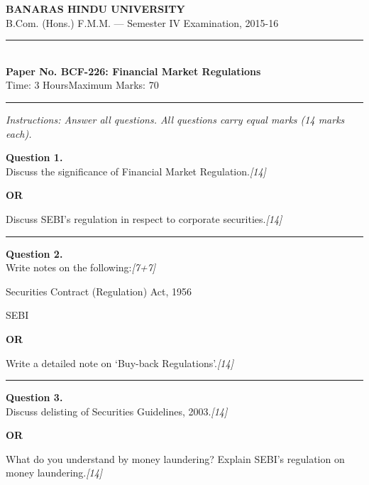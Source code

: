 \documentclass[11pt,a4paper]{article}
\newcommand{\pts}[1]{\hfill   \textit{[#1]}}
\begin{document}
\begin{center}
  {\large\bfseries BANARAS HINDU UNIVERSITY}\\[2pt]
  {\normalsize B.Com. (Hons.) F.M.M. --- Semester IV Examination, 2015-16}\\[6pt]
  \rule{0.8\linewidth}{0.5pt}\\[6pt]
  {\large\bfseries Paper No. BCF-226: Financial Market Regulations}\\[4pt]
  {\normalsize Time: 3 Hours\hfill Maximum Marks: 70}
\end{center}

\rule{\linewidth}{0.4pt}

\smallskip



\noindent   \textit{Instructions: Answer all questions. All questions carry equal marks (14 marks each).}

\bigskip




\noindent   \textbf{Question 1.} \\
Discuss the significance of Financial Market Regulation.\pts{14}

\centerline{   \textbf{OR}}

Discuss SEBI's regulation in respect to corporate securities.\pts{14}

\medskip\rule{\linewidth}{0.2pt}




\noindent   \textbf{Question 2.} \\
Write notes on the following:\pts{7+7}

\begin{parts}
  \item Securities Contract (Regulation) Act, 1956
  \item SEBI
\end{parts}

\centerline{   \textbf{OR}}

Write a detailed note on `Buy-back Regulations'.\pts{14}

\medskip\rule{\linewidth}{0.2pt}

\pagebreak




\noindent   \textbf{Question 3.} \\
Discuss delisting of Securities Guidelines, 2003.\pts{14}

\centerline{   \textbf{OR}}

What do you understand by money laundering? Explain SEBI's regulation on money laundering.\pts{14}
\end{document}
